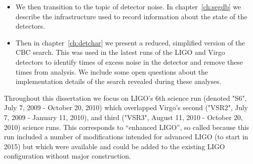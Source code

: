 \begin{itemize}
\item We then transition to the topic of detector noise.  In
chapter~\ref{ch:segdb} we describe the infrastructure used to record 
information about the state of the detectors.

\item Then in chapter~\ref{ch:detchar} we present a reduced,
simplified version of the CBC search.  This was used in the latest
runs of the LIGO and Virgo detectors to identify times of excess noise
in the detector and remove these times from analysis.  We include some
open questions about the implementation details of the search revealed
during these analyses.

\end{itemize}

Throughout this dissertation we focus on LIGO's 6th science run
(denoted "S6", July 7, 2009 - October 20, 2010) which overlapped
Virgo's second ("VSR2", July 7, 2009 - January 11, 2010), and third
("VSR3", August 11, 2010 - October 20, 2010) science runs.  This
corresponds to ``enhanced LIGO'', so called because this run included
a number of modifications intended for advanced LIGO (to start in
2015) but which were available and could be added to the existing
LIGO configuration without major construction.

